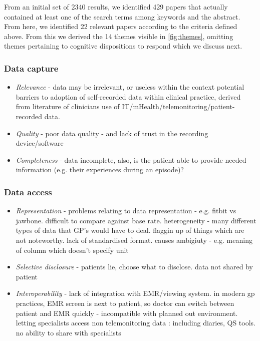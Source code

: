 \documentclass{sigchi}
\begin{document}
From an initial set of 2340 results, we identified 429 papers that actually contained at least one of the search terms among keywords and the abstract. From here, we identified 22 relevant papers according to the criteria defined above.  From this we derived the 14 themes visible in \ref{fig:themes}, omitting themes pertaining to cognitive dispositions to respond which we discuss next.

%
%


\subsubsection{Data capture}

\begin{itemize}
\item \textit{Relevance} - data may be irrelevant, or useless within the context potential barriers to adoption of self-recorded data within clinical practice, derived from literature of clinicians use of IT/mHealth/telemonitoring/patient-recorded data. 
\item \textit{Quality} - poor data quality - and lack of trust in the recording device/software
\item \textit{Completeness} - data incomplete, also, is the patient able to provide needed information (e.g. their experiences during an episode)?
\end{itemize}

\subsubsection{Data access}

\begin{itemize}
\item \textit{Representation} - problems relating to data representation - e.g. fitbit vs jawbone. difficult to compare against base rate. heterogeneity - many different types of data that GP's would have to deal. flaggin up of things which are not noteworthy. lack of standardised format. causes ambigiuty - e.g. meaning of column which doesn't specify unit
\item \textit{Selective disclosure} - patients lie, choose what to disclose. data not shared by patient
\item \textit{Interoperability} - lack of integration with EMR/viewing system. in modern gp practices, EMR screen is next to patient, so doctor can switch between patient and EMR quickly - incompatible with planned out environment. letting specialists access non telemonitoring data : including diaries, QS tools. no ability to share with specialists
\end{itemize}
\end{document}
